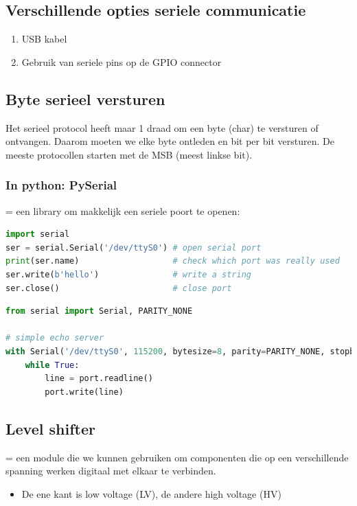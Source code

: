 \documentclass{article}
\begin{document}
\subsection{Verschillende opties seriele communicatie}
\begin{enumerate}
    \item USB kabel
    \item Gebruik van seriele pins op de GPIO connector
\end{enumerate}

\subsection{Byte serieel versturen}
Het serieel protocol heeft maar 1 draad om een byte (char) te versturen of ontvangen.
Daarom moeten we elke byte ontleden en bit per bit versturen. De meeste protocollen starten met de MSB (meest linkse bit).

\subsubsection{In python: PySerial}
= een library om makkelijk een seriele poort te openen:

\begin{lstlisting}[language=Python]
import serial
ser = serial.Serial('/dev/ttyS0') # open serial port
print(ser.name)                   # check which port was really used
ser.write(b'hello')               # write a string
ser.close()                       # close port
\end{lstlisting}

\begin{lstlisting}[language=Python]
from serial import Serial, PARITY_NONE

# simple echo server
with Serial('/dev/ttyS0', 115200, bytesize=8, parity=PARITY_NONE, stopbits=1) as port:
    while True:
        line = port.readline()
        port.write(line)
\end{lstlisting}

\subsection{Level shifter}
= een module die we kunnen gebruiken om componenten die op een verschillende 
spanning werken digitaal met elkaar te verbinden. 

\begin{itemize}
    \item De ene kant is low voltage (LV), de andere high voltage (HV)
\end{itemize}
\end{document}
